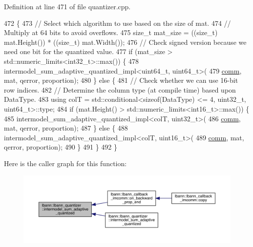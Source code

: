 Definition at line 471 of file quantizer.\+cpp.


\begin{DoxyCode}
472                                                            \{
473   \textcolor{comment}{// Select which algorithm to use based on the size of mat.}
474   \textcolor{comment}{// Multiply at 64 bits to avoid overflows.}
475   \textcolor{keywordtype}{size\_t} mat\_size = ((size\_t) mat.Height()) * ((\textcolor{keywordtype}{size\_t}) mat.Width());
476   \textcolor{comment}{// Check signed version because we need one bit for the quantized value.}
477   \textcolor{keywordflow}{if} (mat\_size > std::numeric\_limits<int32\_t>::max()) \{
478     intermodel\_sum\_adaptive\_quantized\_impl<uint64\_t, uint64\_t>(
479       \hyperlink{file__io_8cpp_ab048c6f9fcbcfaa57ce68b00263dbebe}{comm}, mat, qerror, proportion);
480   \} \textcolor{keywordflow}{else} \{
481     \textcolor{comment}{// Check whether we can use 16-bit row indices.}
482     \textcolor{comment}{// Determine the column type (at compile time) based upon DataType.}
483     \textcolor{keyword}{using} colT = std::conditional<sizeof(DataType) <= 4, uint32\_t, uint64\_t>::type;
484     \textcolor{keywordflow}{if} (mat.Height() > std::numeric\_limits<int16\_t>::max()) \{
485       intermodel\_sum\_adaptive\_quantized\_impl<colT, uint32\_t>(
486         \hyperlink{file__io_8cpp_ab048c6f9fcbcfaa57ce68b00263dbebe}{comm}, mat, qerror, proportion);
487     \} \textcolor{keywordflow}{else} \{
488       intermodel\_sum\_adaptive\_quantized\_impl<colT, uint16\_t>(
489         \hyperlink{file__io_8cpp_ab048c6f9fcbcfaa57ce68b00263dbebe}{comm}, mat, qerror, proportion);
490     \}
491   \}
492 \}
\end{DoxyCode}
Here is the caller graph for this function\+:\nopagebreak
\begin{figure}[H]
\begin{center}
\leavevmode
\includegraphics[width=350pt]{classlbann_1_1lbann__quantizer_a87e856d8bf5e8a678a39cdb8f547dfd9_icgraph}
\end{center}
\end{figure}
\mbox{\label{classlbann_1_1lbann__quantizer_aa2d4e5b9bc90f8feaaa32f3fc4183d10}} 
